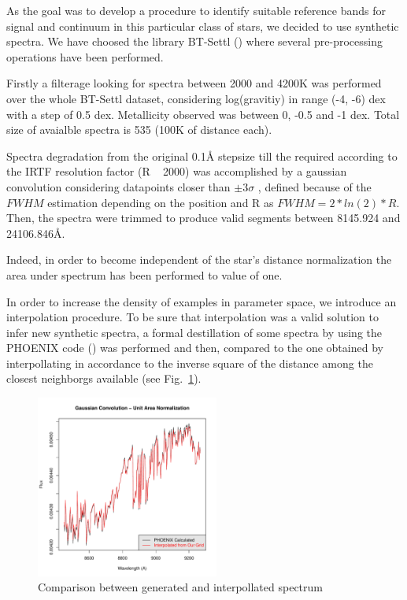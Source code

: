 

{ As the goal was to develop a procedure to identify suitable
  reference bands for signal and continuum in this particular class of
  stars, we decided to use synthetic spectra. We have choosed the
  library BT-Settl (\cite{2013MSAIS..24..128A}) where several
  pre-processing operations have been performed.  }

{
Firstly a filterage looking for spectra between 2000 and 4200K was performed over 
the whole BT-Settl dataset, considering log(gravitiy) in range (-4, -6) dex 
with a step of 0.5 dex. Metallicity observed was between 0, -0.5 and -1 dex.
Total size of avaialble spectra is 535 (100K of distance each). 

Spectra degradation from the original 0.1{\AA} stepsize till the required
according to the IRTF resolution factor (R ~ 2000) was accomplished by a gaussian convolution
considering datapoints closer than $\pm 3 \sigma$ , defined because of the $FWHM$ estimation 
depending on the position and R as $ FWHM=2*ln(2)*R $.
Then, the spectra were trimmed to produce valid segments between 8145.924 and 24106.846{\AA}.
}
{
Indeed, in order to become independent of the star\textquoteright s distance 
normalization the area under spectrum has been performed to value of one.
}


{ In order to increase the density of examples in parameter space, we
  introduce an interpolation procedure. To be sure that interpolation
  was a valid solution to infer new synthetic spectra, a formal
  destillation of some spectra by using the PHOENIX code
  (\cite{fuhrmeister2005phoenix}) was performed and then, compared to
  the one obtained by interpollating in accordance to the inverse
  square of the distance among the closest neighborgs available (see
  Fig.~\ref{fig:comp_gen_inter}).  }

\begin {figure}
 \begin{center}
 \includegraphics[width=6cm]{figs/intgrid4_gauss.pdf}
 \caption{Comparison between generated and interpollated spectrum}
 \label{fig:comp_gen_inter}
 \end{center}
\end {figure}

